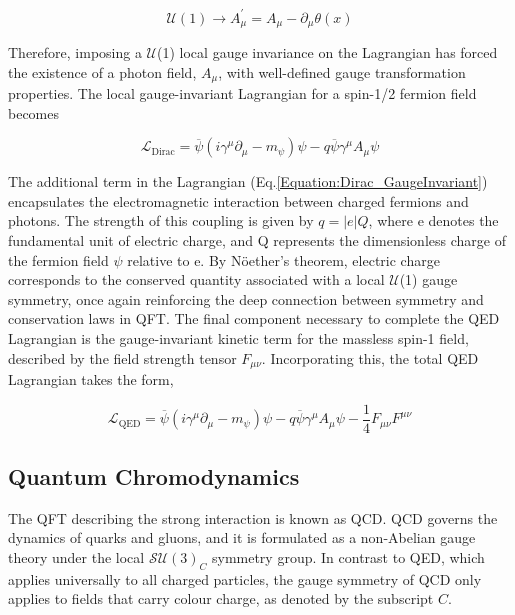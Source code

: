 \begin{equation}
    \mathcal{U}(1) \rightarrow A_\mu^{\prime} = A_\mu - \partial_\mu \theta(x) 
\end{equation}

Therefore, imposing a $\mathcal{U}$(1) local gauge invariance on the Lagrangian has forced the existence of a photon field, $A_\mu$, with well-defined gauge transformation properties. The local gauge-invariant Lagrangian for a spin-1/2 fermion field becomes

\begin{equation}
    \mathcal{L}_{\text{Dirac}} = \overline{\psi}(i\gamma^\mu \partial_\mu - m_{\psi}) \psi - q\overline{\psi}\gamma^\mu A_\mu\psi
\label{Equation:Dirac_GaugeInvariant}
\end{equation}

The additional term in the Lagrangian (Eq.\ref{Equation:Dirac_GaugeInvariant}) encapsulates the electromagnetic interaction between charged fermions and photons. The strength of this coupling is given by $q = |e|Q$, where e denotes the fundamental unit of electric charge, and Q represents the dimensionless charge of the fermion field $\psi$ relative to e. By N\"{o}ether's theorem, electric charge corresponds to the conserved quantity associated with a local $\mathcal{U}$(1) gauge symmetry, once again reinforcing the deep connection between symmetry and conservation laws in QFT. The final component necessary to complete the QED Lagrangian is the gauge-invariant kinetic term for the massless spin-1 field, described by the field strength tensor $F_{\mu\nu}$. Incorporating this, the total QED Lagrangian takes the form,

\begin{equation}
    \mathcal{L}_{\text{QED}} = \overline{\psi}(i\gamma^\mu \partial_\mu - m_{\psi}) \psi - q\overline{\psi}\gamma^\mu A_\mu\psi - \frac{1}{4}F_{\mu\nu}F^{\mu\nu}
\label{Equation:QED_GaugeInvariant}
\end{equation}

\subsection{Quantum Chromodynamics}

The QFT describing the strong interaction is known as \ac{QCD}. QCD governs the dynamics of quarks and gluons, and it is formulated as a non-Abelian gauge theory under the local $\mathcal{SU}(3)_C$ symmetry group. In contrast to QED, which applies universally to all charged particles, the gauge symmetry of QCD only applies to fields that carry colour charge, as denoted by the subscript $C$.

